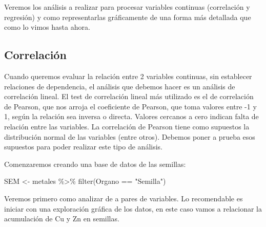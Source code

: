 \documentclass[
  letterpaper,
  DIV=11,
  numbers=noendperiod]{scrartcl}
\newenvironment{Shaded}{\begin{snugshade}}{\end{snugshade}}
\newcommand{\AttributeTok}[1]{\textcolor[rgb]{0.40,0.45,0.13}{#1}}
\newcommand{\CommentTok}[1]{\textcolor[rgb]{0.37,0.37,0.37}{#1}}
\newcommand{\DecValTok}[1]{\textcolor[rgb]{0.68,0.00,0.00}{#1}}
\newcommand{\FunctionTok}[1]{\textcolor[rgb]{0.28,0.35,0.67}{#1}}
\newcommand{\NormalTok}[1]{\textcolor[rgb]{0.00,0.23,0.31}{#1}}
\newcommand{\OtherTok}[1]{\textcolor[rgb]{0.00,0.23,0.31}{#1}}
\newcommand{\SpecialCharTok}[1]{\textcolor[rgb]{0.37,0.37,0.37}{#1}}
\newcommand{\StringTok}[1]{\textcolor[rgb]{0.13,0.47,0.30}{#1}}
\begin{document}
Veremos los análisis a realizar para procesar variables continuas
(correlación y regresión) y como representarlas gráficamente de una
forma más detallada que como lo vimos hasta ahora.

\hypertarget{correlaciuxf3n}{%
\subsection{Correlación}\label{correlaciuxf3n}}

Cuando queremos evaluar la relación entre 2 variables continuas, sin
establecer relaciones de dependencia, el análisis que debemos hacer es
un análisis de correlación lineal. El test de correlación lineal más
utilizado es el de correlación de Pearson, que nos arroja el coeficiente
de Pearson, que toma valores entre -1 y 1, según la relación sea inversa
o directa. Valores cercanos a cero indican falta de relación entre las
variables. La correlación de Pearson tiene como supuestos la
distribución normal de las variables (entre otros). Debemos poner a
prueba esos supuestos para poder realizar este tipo de análisis.

Comenzaremos creando una base de datos de las semillas:

\begin{Shaded}
\begin{Highlighting}[]
\NormalTok{SEM }\OtherTok{\textless{}{-}}\NormalTok{ metales }\SpecialCharTok{\%\textgreater{}\%} \FunctionTok{filter}\NormalTok{(Organo }\SpecialCharTok{==} \StringTok{"Semilla"}\NormalTok{)}
\end{Highlighting}
\end{Shaded}

Veremos primero como analizar de a pares de variables. Lo recomendable
es iniciar con una exploración gráfica de los datos, en este caso vamos
a relacionar la acumulación de Cu y Zn en semillas.

\begin{Shaded}
\end{Shaded}
\end{document}
